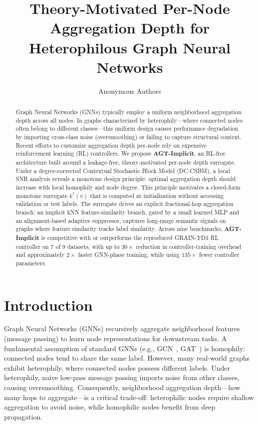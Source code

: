 \documentclass[letterpaper]{article}
\title{Theory-Motivated Per-Node Aggregation Depth for Heterophilous Graph Neural Networks}
\author{Anonymous Authors}
\newcommand{\methodname}{\textbf{AGT-Implicit}}
\begin{document}
\maketitle

\begin{abstract}
Graph Neural Networks (GNNs) typically employ a uniform neighborhood aggregation depth across all nodes. In graphs characterized by heterophily---where connected nodes often belong to different classes---this uniform design causes performance degradation by importing cross-class noise (oversmoothing) or failing to capture structural context. Recent efforts to customize aggregation depth per-node rely on expensive reinforcement learning (RL) controllers. We propose \methodname, an RL-free architecture built around a leakage-free, theory-motivated per-node depth surrogate. Under a degree-corrected Contextual Stochastic Block Model (DC-CSBM), a local SNR analysis reveals a monotone design principle: optimal aggregation depth should increase with local homophily and node degree. This principle motivates a closed-form monotone surrogate $k^*(v)$ that is computed at initialization without accessing validation or test labels. The surrogate drives an explicit fractional-hop aggregation branch; an implicit kNN feature-similarity branch, gated by a small learned MLP and an alignment-based adaptive suppressor, captures long-range semantic signals on graphs where feature similarity tracks label similarity. Across nine benchmarks, \methodname{} is competitive with or outperforms the reproduced GRAIN-TD3 RL controller on 7 of 9 datasets, with up to $30\times$ reduction in controller-training overhead and approximately $2\times$ faster GNN-phase training, while using $135\times$ fewer controller parameters.
\end{abstract}

\section{Introduction}
\label{sec:intro}

Graph Neural Networks (GNNs) recursively aggregate neighborhood features (message passing) to learn node representations for downstream tasks. A fundamental assumption of standard GNNs (e.g., GCN~\cite{kipf2017gcn}, GAT~\cite{gat2018}) is homophily: connected nodes tend to share the same label. However, many real-world graphs exhibit heterophily, where connected nodes possess different labels. Under heterophily, naive low-pass message passing imports noise from other classes, causing oversmoothing. Consequently, neighborhood aggregation depth---how many hops to aggregate---is a critical trade-off: heterophilic nodes require shallow aggregation to avoid noise, while homophilic nodes benefit from deep propagation.
\end{document}
